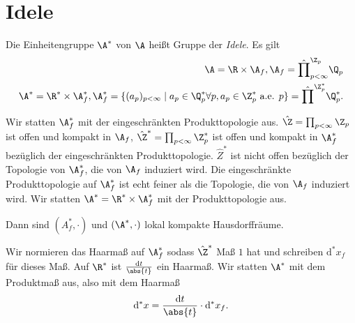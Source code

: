 \chapter{Idele}
\begin{defi}
Die Einheitengruppe $\A^\ast$ von $\A$ heißt Gruppe der \emph{Idele}.
Es gilt
\begin{align*}
\A =\R \times \A_f, \A_f=\hat{\prod}_{p <\infty}^{\Z_p} \Q_p\\
\A^\ast =\R^\ast \times \A_f^\ast, \A_f^\ast=\{(a_p)_{p<\infty} \mid a_p \in \Q_p^\ast \forall p, a_p \in \Z_p^\ast \text{ a.e. } p\}=\hat{\prod}^{\Z_p^\ast} \Q_p^\ast.
\end{align*}
\end{defi}
Wir statten $\A_f^\ast$ mit der eingeschränkten Produkttopologie aus.
$\hat{\Z}=\prod_{p<\infty} \Z_p$ ist offen und kompakt in $\A_f$,
$\hat{\Z}^\ast=\prod_{p<\infty} \Z_p^\ast$ ist offen und kompakt in $\A_f^\ast$ bezüglich der eingeschränkten Produkttopologie.
$\hat{Z}^\ast$ ist nicht offen bezüglich der Topologie von $\A_f^\ast$, die von $\A_f$ induziert wird.
Die eingeschränkte Produkttopologie auf $\A_f^\ast$ ist echt feiner als die Topologie, die von $\A_f$ induziert wird.
Wir statten $\A^\ast=\R^\ast\times \A_f^\ast$ mit der Produkttopologie aus. 

\begin{thm}
Dann sind $(A_f^\ast,\cdot)$ und $(\A^\ast,\cdot)$ lokal kompakte Hausdorffräume.
\end{thm}

Wir normieren das Haarmaß auf $\A_f^\ast$ sodass $\hat{\Z}^\ast$ Maß $1$ hat und schreiben $\mathrm{d}^\ast x_f$ für dieses Maß.
Auf $\R^\ast$ ist $\frac{\mathrm{d}t}{\abs{t}}$ ein Haarmaß.
Wir statten $\A^\ast$ mit dem Produktmaß aus, also mit dem Haarmaß
\begin{align*}
\mathrm{d}^\ast x=\frac{\mathrm{d}t}{\abs{t}}\cdot \mathrm{d}^\ast x_f.
\end{align*}